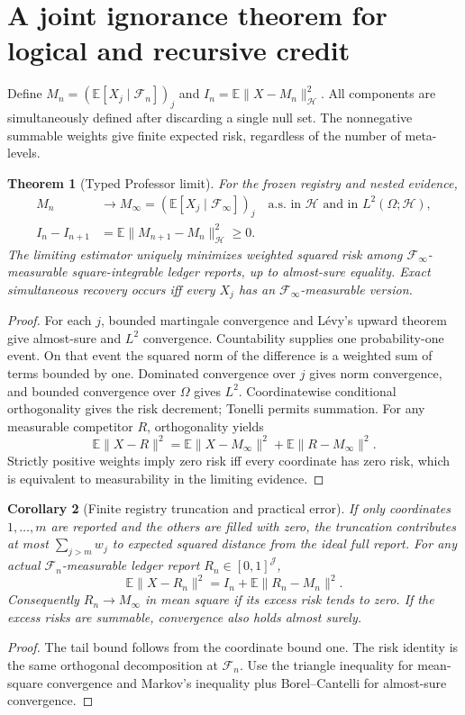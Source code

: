 \documentclass[11pt]{article}
\newtheorem{theorem}{Theorem}[section]\newtheorem{proposition}[theorem]{Proposition}\newtheorem{corollary}[theorem]{Corollary}\newtheorem{definition}[theorem]{Definition}\newtheorem{example}[theorem]{Example}\newtheorem{conjecture}[theorem]{Conjecture}
\newcommand{\E}{\mathbb E}\newcommand{\Prob}{\mathbb P}\newcommand{\F}{\mathcal F}\newcommand{\N}{\mathbb N}\newcommand{\Var}{\operatorname{Var}}\newcommand{\one}{\mathbf 1}\newcommand{\spp}{\mathrm{SPP}}
\begin{document}
\section{A joint ignorance theorem for logical and recursive credit}
Define $M_n=(\E[X_j\mid\F_n])_j$ and $I_n=\E\|X-M_n\|_{\mathcal H}^2$. All components are simultaneously defined after discarding a single null set. The nonnegative summable weights give finite expected risk, regardless of the number of meta-levels.
\begin{theorem}[Typed Professor limit]\label{thm:ledger}
For the frozen registry and nested evidence,
\begin{align}M_n&\longrightarrow M_\infty=(\E[X_j\mid\F_\infty])_j\quad\text{a.s. in }\mathcal H\text{ and in }L^2(\Omega;\mathcal H),\\
I_n-I_{n+1}&=\E\|M_{n+1}-M_n\|_{\mathcal H}^2\geq0.\label{eq:ignorance}\end{align}
The limiting estimator uniquely minimizes weighted squared risk among $\F_\infty$-measurable square-integrable ledger reports, up to almost-sure equality. Exact simultaneous recovery occurs iff every $X_j$ has an $\F_\infty$-measurable version.
\end{theorem}
\begin{proof}For each $j$, bounded martingale convergence and L\'evy's upward theorem \cite{williams} give almost-sure and $L^2$ convergence. Countability supplies one probability-one event. On that event the squared norm of the difference is a weighted sum of terms bounded by one. Dominated convergence over $j$ gives norm convergence, and bounded convergence over $\Omega$ gives $L^2$. Coordinatewise conditional orthogonality gives the risk decrement; Tonelli permits summation. For any measurable competitor $R$, orthogonality yields
\[\E\|X-R\|^2=\E\|X-M_\infty\|^2+\E\|R-M_\infty\|^2.\]
Strictly positive weights imply zero risk iff every coordinate has zero risk, which is equivalent to measurability in the limiting evidence.\end{proof}

\begin{corollary}[Finite registry truncation and practical error]
If only coordinates $1,\ldots,m$ are reported and the others are filled with zero, the truncation contributes at most $\sum_{j>m}w_j$ to expected squared distance from the ideal full report. For any actual $\F_n$-measurable ledger report $R_n\in[0,1]^{\mathcal J}$,
\[\E\|X-R_n\|^2=I_n+\E\|R_n-M_n\|^2.\]
Consequently $R_n\to M_\infty$ in mean square if its excess risk tends to zero. If the excess risks are summable, convergence also holds almost surely.
\end{corollary}
\begin{proof}The tail bound follows from the coordinate bound one. The risk identity is the same orthogonal decomposition at $\F_n$. Use the triangle inequality for mean-square convergence and Markov's inequality plus Borel--Cantelli for almost-sure convergence.\end{proof}
\end{document}
